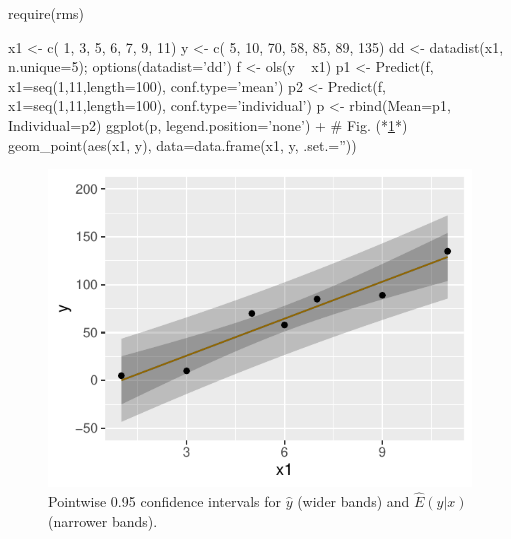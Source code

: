 \begin{Schunk}
\begin{Sinput}
require(rms)
\end{Sinput}
\begin{Sinput}
x1 <- c( 1,  3,  5,  6,  7,  9,  11)
y  <- c( 5, 10, 70, 58, 85, 89, 135)
dd <- datadist(x1, n.unique=5); options(datadist='dd')
f <- ols(y ~ x1)
p1 <- Predict(f, x1=seq(1,11,length=100), conf.type='mean')
p2 <- Predict(f, x1=seq(1,11,length=100), conf.type='individual')
p <- rbind(Mean=p1, Individual=p2)
ggplot(p, legend.position='none') +    # Fig. (*\ref{fig:reg-both-type-cls}*)
     geom_point(aes(x1, y), data=data.frame(x1, y, .set.=''))
\end{Sinput}
\begin{figure}[htbp]

\centerline{\includegraphics[width=\maxwidth]{reg-both-type-cls-1} }

\caption[Two types of confidence bands]{Pointwise 0.95 confidence intervals for $\hat{y}$ (wider bands) and $\hat{E}(y|x)$ (narrower bands).}\label{fig:reg-both-type-cls}
\end{figure}
\end{Schunk}
\ei
\clearpage

